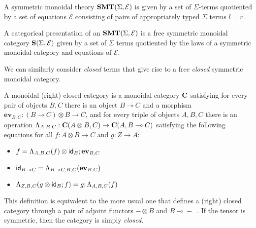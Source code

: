\begin{definition}

A symmetric monoidal theory $\mathbf{SMT}(\Sigma, \mathcal{E})$ is given by a set of $\Sigma$-terms quotiented by a set of equations $\mathcal{E}$ consisting of pairs of appropriately typed $\Sigma$ terms $l = r$.
\end{definition}

\begin{definition}
A categorical presentation of an $\mathbf{SMT}(\Sigma, \mathcal{E})$ is a free symmetric monoidal category $\mathbf{S}(\Sigma, \mathcal{E})$ given by a set of $\Sigma$ terms quotiented by the laws of a symmetric monoidal category and equations of $\mathcal{E}$.
\end{definition}

We can similarly consider \textit{closed} terms that give rise to a free \textit{closed} symmetric monoidal category.

\begin{definition}
\label{def:closed}
A monoidal (right) closed category is a monoidal category $\mathbf{C}$ satisfying for
every pair of objects $B,C$ there is an object $B \multimap C$ and a morphism $\textbf{ev}_{B,C} : (B \multimap C) \otimes B \to
C$, and for every triple of objects $A,B,C$ there is an operation $\Lambda_{A,B,C} : \mathbf{C}(A \otimes B,C) \to
\mathbf{C}(A,B \multimap{} C)$ satisfying the following equations for all $f : A \otimes B \to C$ and $g : Z \to A$:
\begin{itemize}
\item $f = \Lambda_{A,B,C}(f) \otimes \textsf{id}_{B}; \textbf{ev}_{B,C}$
\item $\textsf{id}_{B \multimap{} C} = \Lambda_{B \multimap{} C,B,C}(\textbf{ev}_{B,C})$
\item $\Lambda_{Z,B,C}(g \otimes \textsf{id}_{B}; f) = g;\Lambda_{A,B,C}(f)$
\end{itemize}
\end{definition}

This definition is equivalent to the more usual one that defines a (right) closed category through a pair of adjoint functors $- \otimes B$ and $B \multimap{} -$~\cite{ghica-zanassi2023string}.
If the tensor is symmetric, then the category is simply \textit{closed}.

